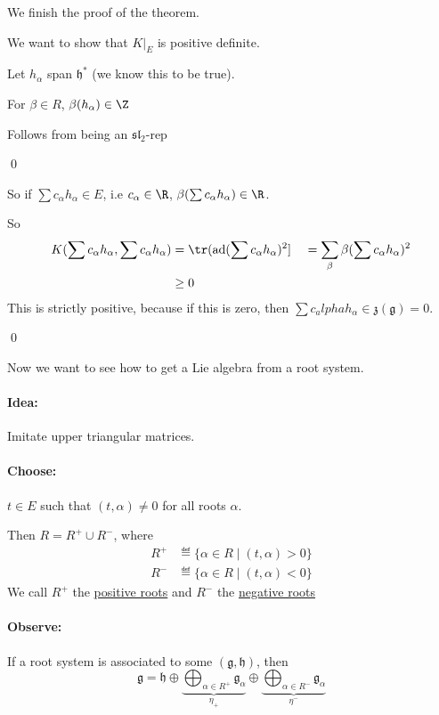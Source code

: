 \documentclass[x11names,reqno,14pt]{extarticle}
\newcommand{\mk}[1]{\mathfrak{#1}}
\newcommand{\g}{\mk{g}}
\newcommand{\h}{\mk{h}}
\DeclareMathOperator{\ad}{ad}
\renewcommand{\sl}{\mk{s}\mk{l}}
\begin{document}
We finish the proof of the theorem. 

\proof

We want to show that $K|_E$ is positive definite. 

Let $h_\alpha$ span $\h^*$ (we know this to be true). 

\claim

For $\beta \in R$, $\beta(h_\alpha) \in \Z$

\proof

Follows from being an $\sl_2$-rep

\qed

So if $\sum c_\alpha h_\alpha \in E$, i.e $c_\alpha \in \R$, $\beta(\sum c_\alpha h_\alpha)\in\R$. 

So 
\begin{align*}
K(\sum c_\alpha h_\alpha, \sum c_\alpha h_\alpha) & = \tr(\ad(\sum c_\alpha h_\alpha)^2 ]\
& = \sum_\beta \beta(\sum c_\alpha h_\alpha)^2 \\
& \geq 0
\end{align*}
This is strictly positive, because if this is zero, then $\sum c_alpha h_\alpha \in \mk{z}(\g) = 0$. 

\qed

Now we want to see how to get a Lie algebra from a root system.

\paragraph{Idea:} Imitate upper triangular matrices. 

\paragraph{Choose:} $t \in E$ such that $(t,\alpha)\neq0$ for all roots $\alpha$.

Then $R = R^+ \cup R^-$, where
\begin{align*}
R^+ & \eqdef \{\alpha\in R \mid (t,\alpha)>0\} \\
R^- & \eqdef \{\alpha\in R \mid (t,\alpha)<0\}
\end{align*}
We call $R^+$ the \underline{positive roots} and $R^-$ the \underline{negative roots}

\paragraph{Observe:} If a root system is associated to some $(\g,\h)$, then 
\[
\g = \h\oplus \underbrace{\bigoplus_{\alpha\in R^+}\g_\alpha}_{\eta_+} \oplus \underbrace{\bigoplus_{\alpha\in R^-}\g_\alpha}_{\eta^-}
\]
\end{document}
